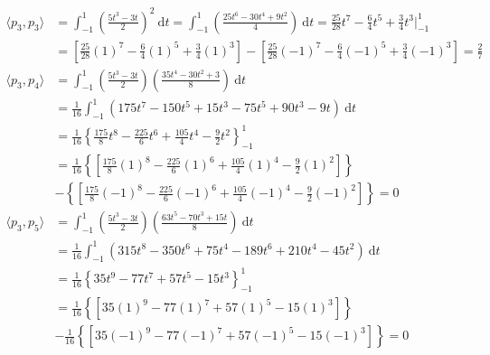 \begin{align*}
\langle p_3, p_3 \rangle &= \int_{-1}^{1} \left(\frac{5t^3-3t}{2}\right)^2\:\mathrm{d}t= \int_{-1}^{1}\left(\frac{25t^6-30t^4+9t^2}{4}\right)\:\mathrm{d}t = \frac{25}{28}t^7-\frac{6}{4}t^5+\frac{3}{4}t^3\Big|_{-1}^{1}\\
&= \left[\frac{25}{28}(1)^7-\frac{6}{4}(1)^5+\frac{3}{4}(1)^3\right] - \left[\frac{25}{28}(-1)^7-\frac{6}{4}(-1)^5+\frac{3}{4}(-1)^3\right] = \boxed{\frac{2}{7}} \\
\langle p_3, p_4 \rangle &= \int_{-1}^{1} \left(\frac{5t^3-3t}{2}\right)\left(\frac{35t^4-30t^2+3}{8}\right)\:\mathrm{d}t\\
&= \frac{1}{16}\int_{-1}^{1}\left(175t^7-150t^5+15t^3-75t^5+90t^3-9t\right)\:\mathrm{d}t \\
&= \frac{1}{16}\left\lbrace\frac{175}{8}t^8-\frac{225}{6}t^6+\frac{105}{4}t^4-\frac{9}{2}t^2\right\rbrace_{-1}^{1} \\
&= \frac{1}{16}\left\lbrace\left[\frac{175}{8}(1)^8-\frac{225}{6}(1)^6+\frac{105}{4}(1)^4-\frac{9}{2}(1)^2\right]\right\rbrace \\ &- \left\lbrace\left[\frac{175}{8}(-1)^8-\frac{225}{6}(-1)^6+\frac{105}{4}(-1)^4-\frac{9}{2}(-1)^2\right]\right\rbrace = \boxed{0} \\
\langle p_3, p_5 \rangle &= \int_{-1}^{1} \left(\frac{5t^3-3t}{2}\right)\left(\frac{63t^5-70t^3+15t}{8}\right)\:\mathrm{d}t\\
&= \frac{1}{16}\int_{-1}^{1}\left(315t^8-350t^6+75t^4-189t^6+210t^4-45t^2\right)\:\mathrm{d}t\\
&=\frac{1}{16}\left\lbrace 35t^9-77t^7+57t^5-15t^3 \right\rbrace_{-1}^{1} \\
&=\frac{1}{16}\left\lbrace\left[35(1)^9-77(1)^7+57(1)^5-15(1)^3\right]\right\rbrace \\ &- \frac{1}{16}\left\lbrace\left[35(-1)^9-77(-1)^7+57(-1)^5-15(-1)^3\right]\right\rbrace = \boxed{0}
\end{align*}
